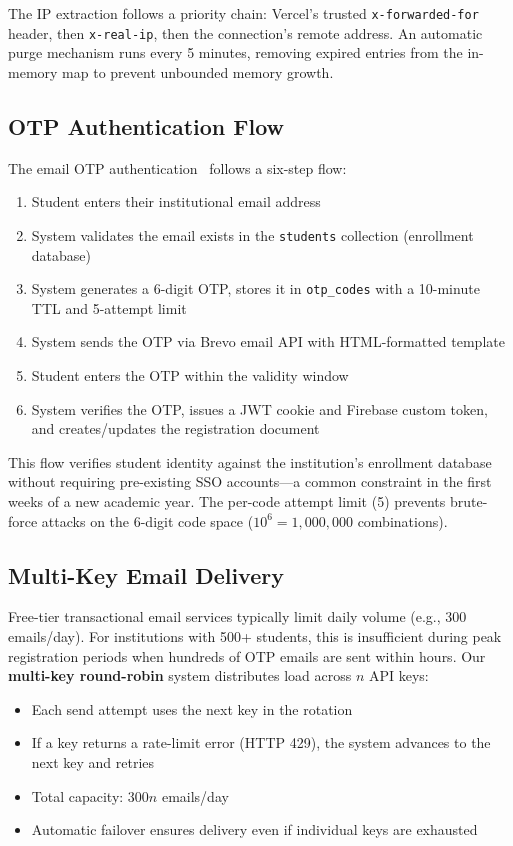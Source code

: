 \documentclass[conference]{IEEEtran}
\begin{document}
The IP extraction follows a priority chain: Vercel's trusted \texttt{x-forwarded-for} header, then \texttt{x-real-ip}, then the connection's remote address. An automatic purge mechanism runs every 5 minutes, removing expired entries from the in-memory map to prevent unbounded memory growth.

\subsection{OTP Authentication Flow}

The email OTP authentication~\cite{mraihi2011} follows a six-step flow:

\begin{enumerate}[noitemsep,topsep=3pt]
    \item Student enters their institutional email address
    \item System validates the email exists in the \texttt{students} collection (enrollment database)
    \item System generates a 6-digit OTP, stores it in \texttt{otp\_codes} with a 10-minute TTL and 5-attempt limit
    \item System sends the OTP via Brevo email API with HTML-formatted template
    \item Student enters the OTP within the validity window
    \item System verifies the OTP, issues a JWT cookie and Firebase custom token, and creates/updates the registration document
\end{enumerate}

This flow verifies student identity against the institution's enrollment database without requiring pre-existing SSO accounts---a common constraint in the first weeks of a new academic year. The per-code attempt limit (5) prevents brute-force attacks on the 6-digit code space ($10^6 = 1{,}000{,}000$ combinations).

\subsection{Multi-Key Email Delivery}

Free-tier transactional email services typically limit daily volume (e.g., 300 emails/day). For institutions with 500+ students, this is insufficient during peak registration periods when hundreds of OTP emails are sent within hours. Our \textbf{multi-key round-robin} system distributes load across $n$ API keys:

\begin{itemize}[noitemsep,topsep=3pt]
    \item Each send attempt uses the next key in the rotation
    \item If a key returns a rate-limit error (HTTP 429), the system advances to the next key and retries
    \item Total capacity: $300n$ emails/day
    \item Automatic failover ensures delivery even if individual keys are exhausted
\end{itemize}
\end{document}
